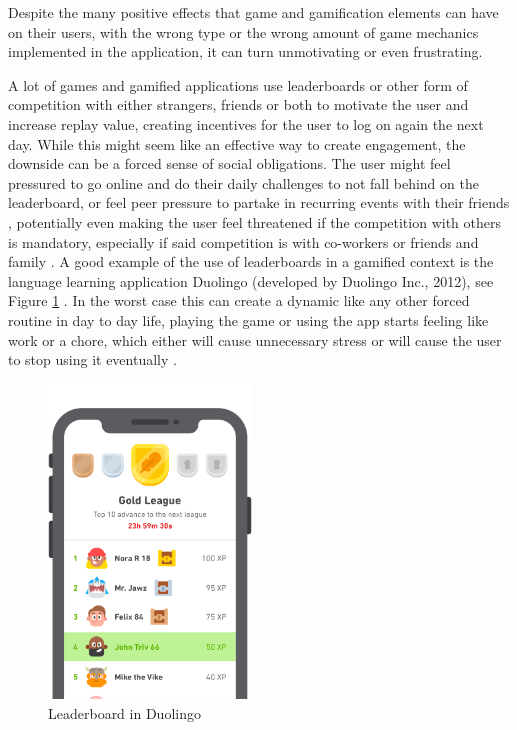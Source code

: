 Despite the many positive effects that game and gamification elements can have on their users, with the wrong type or the wrong amount of game mechanics implemented in the application, it can turn unmotivating or even frustrating.

A lot of games and gamified applications use leaderboards or other form of competition with either strangers, friends or both to motivate the user and increase replay value, creating incentives for the user to log on again the next day. While this might seem like an effective way to create engagement, the downside can be a forced sense of social obligations. The user might feel pressured to go online and do their daily challenges to not fall behind on the leaderboard, or feel peer pressure to partake in recurring events with their friends \cite{mmo}, potentially even making the user feel threatened if the competition with others is mandatory, especially if said competition is with co-workers or friends and family \cite{lifelong}. A good example of the use of leaderboards in a gamified context is the language learning application Duolingo (developed by Duolingo Inc., 2012), see Figure \ref{fig:1} \cite{leaderboard}. In the worst case this can create a dynamic like any other forced routine in day to day life, playing the game or using the app starts feeling like work or a chore, which either will cause unnecessary stress or will cause the user to stop using it eventually \cite{mmo}.

\begin{figure}[h]
    \centering
    \includegraphics[width=0.48\textwidth]{figures/leaderboard}
    \caption{Leaderboard in Duolingo}
    \label{fig:1}
\end{figure}

